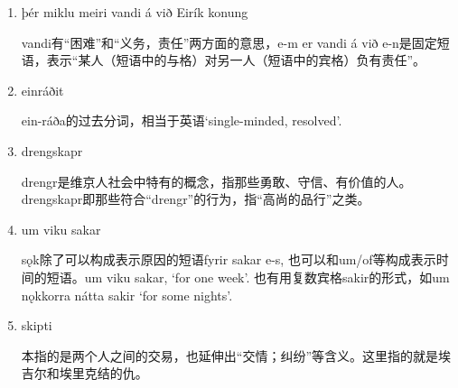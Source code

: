 \begin{grammar*}{}
  \begin{enumerate}[leftmargin=*]
    \item þér miklu meiri vandi á við Eirík konung

          vandi有“困难”和“义务，责任”两方面的意思，e-m er vandi á við e-n是固定短语，表示“某人（短语中的与格）对另一人（短语中的宾格）负有责任”。

    \item einráðit

          ein-ráða的过去分词，相当于英语`single-minded, resolved'.

    \item drengskapr

          drengr是维京人社会中特有的概念，指那些勇敢、守信、有价值的人。drengskapr即那些符合“drengr”的行为，指“高尚的品行”之类。

    \item um viku sakar

          sǫk除了可以构成表示原因的短语fyrir sakar e-s, 也可以和um/of等构成表示时间的短语。um viku sakar, `for one week'. 也有用复数宾格sakir的形式，如um nǫkkorra nátta sakir `for some nights'.

    \item skipti

          本指的是两个人之间的交易，也延伸出“交情；纠纷”等含义。这里指的就是埃吉尔和埃里克结的仇。
  \end{enumerate}
\end{grammar*}
